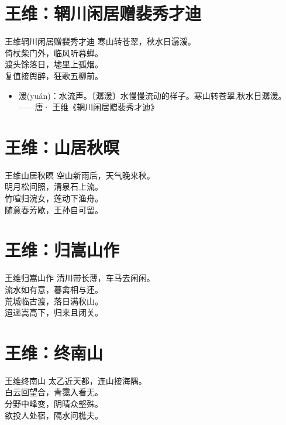 \documentclass[12pt,oneside,a5paper]{book}
\begin{document}
\chapter{王维：辋川闲居赠裴秀才迪}
\begin{poemzh}{王维}{辋川闲居赠裴秀才迪}
寒山转苍翠，秋水日潺湲。\\
倚杖柴门外，临风听暮蝉。\\
渡头馀落日，墟里上孤烟。\\
复值接舆醉，狂歌五柳前。\\ 
\end{poemzh}

\begin{itemize}
\item 湲(yuán)：水流声。〔潺湲〕水慢慢流动的样子。寒山转苍翠,秋水日潺湲。——唐· 王维《辋川闲居赠裴秀才迪》
\end{itemize}

\chapter{王维：山居秋暝}
\begin{poemzh}{王维}{山居秋暝}
空山新雨后，天气晚来秋。\\
明月松间照，清泉石上流。\\
竹喧归浣女，莲动下渔舟。\\
随意春芳歇，王孙自可留。\\ 
\end{poemzh}

\chapter{王维：归嵩山作}
\begin{poemzh}{王维}{归嵩山作}
清川带长薄，车马去闲闲。\\
流水如有意，暮禽相与还。\\
荒城临古渡，落日满秋山。\\
迢递嵩高下，归来且闭关。\\ 
\end{poemzh}

\chapter{王维：终南山}
\begin{poemzh}{王维}{终南山}
太乙近天都，连山接海隅。\\
白云回望合，青霭入看无。\\
分野中峰变，阴晴众壑殊。\\
欲投人处宿，隔水问樵夫。\\ 
\end{poemzh}
\end{document}
